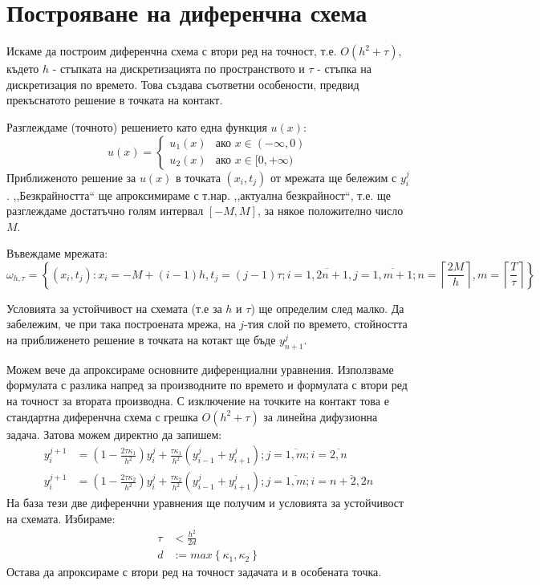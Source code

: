 \section{Построяване на диференчна схема}
Искаме да построим диференчна схема с втори ред на точност, т.е. $O(h^2 + \tau)$, където $h$ - стъпката на дискретизацията по пространството и $\tau$  - стъпка на дискретизация по времето.
Това създава съответни особености, предвид прекъснатото решение в точката на контакт.

\noindent Разглеждаме (точното) решението като една функция $u(x)$:
\begin{equation}
    u(x)=
        \begin{cases}
            u_1(x) & \text{ако } x \in (-\infty, 0)\\
            u_2(x) & \text{ако } x \in [0, +\infty)
        \end{cases}
\end{equation}
Приближеното решение за $u(x)$ в точката $(x_i, t_j)$ от мрежата ще бележим с $y_{i}^{j}$. ,,Безкрайността`` ще апроксимираме с т.нар. ,,актуална безкрайност``, т.е. ще разглеждаме достатъчно голям интервал $[-M, M]$, за някое положително число $M$.

\noindent Въвеждаме мрежата:
\begin{equation*}
    \omega_{h, \tau } = \left\{ (x_i, t_j):  x_i = -M + (i-1) h, t_j = (j-1) \tau; i = \overline{1,2n+1}, j = \overline{1,m+1};  n = \left\lceil \frac{2M}{h} \right\rceil, m =\left\lceil \frac{T}{\tau} \right\rceil \right\}
\end{equation*}

\noindent Условията за устойчивост на схемата (т.е за $h$ и $\tau$) ще определим след малко.
Да забележим, че при така построената мрежа, на $j$-тия слой по времето, стойността на приближенето решение в точката на котакт ще бъде $y_{n+1}^j$.

Можем вече да апроксираме основните диференциални уравнения. Използваме формулата с разлика напред за производните по времето и формулата с втори ред на точност за втората производна.
С изключение на точките на контакт това е стандартна диференчна схема с грешка $O(h^2+\tau)$ за линейна дифузионна задача. Затова можем директно да запишем:
\begin{align}
    y_{i}^{j+1} &= \left(1-\frac{2 \tau \kappa_1}{h^2}\right)y_{i}^j + \frac{\tau \kappa_1}{h^2}\left(y_{i-1}^j + y_{i+1}^j\right); j = \overline{1, m}; i  = \overline{2, n} \\
    y_{i}^{j+1} &= \left(1-\frac{2 \tau \kappa_2}{h^2}\right)y_{i}^j + \frac{\tau \kappa_2}{h^2}\left(y_{i-1}^j + y_{i+1}^j\right); j = \overline{1, m}; i  = \overline{n+2, 2n}
\end{align}
На база тези две диференчни уравнения ще получим и условията за устойчивост на схемата. Избираме:
\begin{align*}
    \tau &< \frac{h^2}{2 d}\\
    d &:= max \left\{\kappa_1, \kappa_2 \right\}
\end{align*}
Остава да апроксираме с втори ред на точност задачата и в особената точка.


